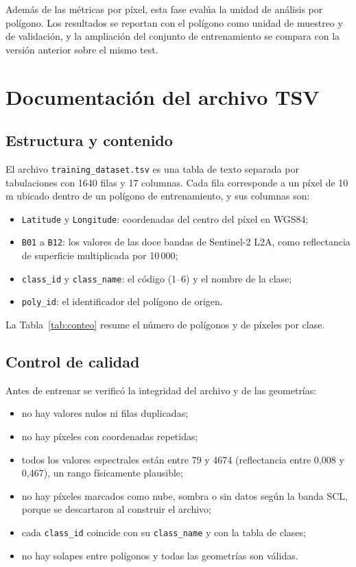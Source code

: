 \documentclass{article}
\begin{document}
Además de las métricas por píxel, esta fase evalúa la unidad de análisis por polígono. Los resultados se reportan con el polígono como unidad de muestreo y de validación, y la ampliación del conjunto de entrenamiento se compara con la versión anterior sobre el mismo test.

\section{Documentación del archivo TSV}

\subsection{Estructura y contenido}
El archivo \texttt{training\_dataset.tsv} es una tabla de texto separada por tabulaciones con 1640 filas y 17 columnas. Cada fila corresponde a un píxel de 10\,m ubicado dentro de un polígono de entrenamiento, y sus columnas son:
\begin{itemize}
 \item \texttt{Latitude} y \texttt{Longitude}: coordenadas del centro del píxel en WGS84;
 \item \texttt{B01} a \texttt{B12}: los valores de las doce bandas de Sentinel-2 L2A, como reflectancia de superficie multiplicada por 10\,000;
 \item \texttt{class\_id} y \texttt{class\_name}: el código (1--6) y el nombre de la clase;
 \item \texttt{poly\_id}: el identificador del polígono de origen.
\end{itemize}
La Tabla~\ref{tab:conteo} resume el número de polígonos y de píxeles por clase.



\subsection{Control de calidad}
Antes de entrenar se verificó la integridad del archivo y de las geometrías:
\begin{itemize}
 \item no hay valores nulos ni filas duplicadas;
 \item no hay píxeles con coordenadas repetidas;
 \item todos los valores espectrales están entre 79 y 4674 (reflectancia entre 0{,}008 y 0{,}467), un rango físicamente plausible;
 \item no hay píxeles marcados como nube, sombra o sin datos según la banda SCL, porque se descartaron al construir el archivo;
 \item cada \texttt{class\_id} coincide con su \texttt{class\_name} y con la tabla de clases;
 \item no hay solapes entre polígonos y todas las geometrías son válidas.
\end{itemize}
\end{document}
